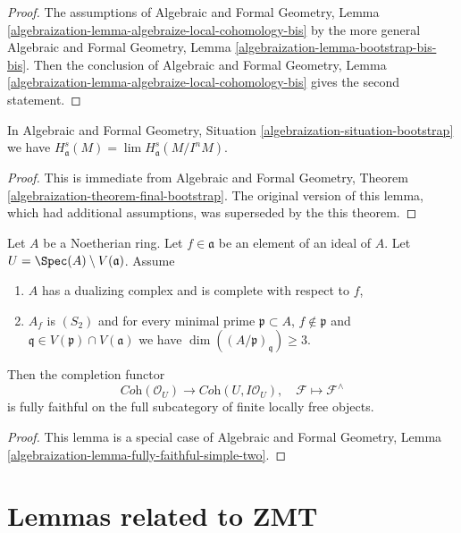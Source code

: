 \begin{proof}
The assumptions of Algebraic and Formal Geometry, Lemma
\ref{algebraization-lemma-algebraize-local-cohomology-bis}
by the more general Algebraic and Formal Geometry, Lemma
\ref{algebraization-lemma-bootstrap-bis-bis}.
Then the conclusion of Algebraic and Formal Geometry, Lemma
\ref{algebraization-lemma-algebraize-local-cohomology-bis}
gives the second statement.
\end{proof}

\begin{lemma}
\label{lemma-combine-one}
In Algebraic and Formal Geometry, Situation
\ref{algebraization-situation-bootstrap}
we have $H^s_\mathfrak a(M) = \lim H^s_\mathfrak a(M/I^nM)$.
\end{lemma}

\begin{proof}
This is immediate from Algebraic and Formal Geometry, Theorem
\ref{algebraization-theorem-final-bootstrap}.
The original version of this lemma, which had additional
assumptions, was superseded by the this theorem.
\end{proof}

\begin{lemma}
\label{lemma-fully-faithful-simple-one}
Let $A$ be a Noetherian ring. Let $f \in \mathfrak a$ be an element of
an ideal of $A$. Let $U = \Spec(A) \setminus V(\mathfrak a)$. Assume
\begin{enumerate}
\item $A$ has a dualizing complex and is complete with respect to $f$,
\item $A_f$ is $(S_2)$ and for every minimal prime $\mathfrak p \subset A$,
$f \not \in \mathfrak p$ and
$\mathfrak q \in V(\mathfrak p) \cap V(\mathfrak a)$ we have
$\dim((A/\mathfrak p)_\mathfrak q) \geq 3$.
\end{enumerate}
Then the completion functor
$$
\textit{Coh}(\mathcal{O}_U)
\longrightarrow
\textit{Coh}(U, I\mathcal{O}_U),
\quad
\mathcal{F} \longmapsto \mathcal{F}^\wedge
$$
is fully faithful on the full subcategory of finite locally free objects.
\end{lemma}

\begin{proof}
This lemma is a special case of Algebraic and Formal Geometry, Lemma
\ref{algebraization-lemma-fully-faithful-simple-two}.
\end{proof}





\section{Lemmas related to ZMT}
\label{section-ZMT}

